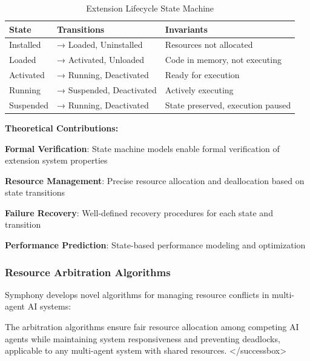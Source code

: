 \begin{successbox}
\begin{alertbox}
\begin{successbox}
\begin{alertbox}
\begin{infobox}[title=Theoretical Framework: AI-First Design Principles]
\begin{table}[ht]
\centering
\begin{tabular}{@{}lll@{}}
\toprule
\textbf{State} & \textbf{Transitions} & \textbf{Invariants} \\
\midrule
Installed & → Loaded, Uninstalled & Resources not allocated \\
Loaded & → Activated, Unloaded & Code in memory, not executing \\
Activated & → Running, Deactivated & Ready for execution \\
Running & → Suspended, Deactivated & Actively executing \\
Suspended & → Running, Deactivated & State preserved, execution paused \\
\bottomrule
\end{tabular}
\caption{Extension Lifecycle State Machine}
\label{tab:extension-states}
\end{table}

\textbf{Theoretical Contributions:}

\begin{expandedlist}
    \item \textbf{Formal Verification}: State machine models enable formal verification of extension system properties
    
    \item \textbf{Resource Management}: Precise resource allocation and deallocation based on state transitions
    
    \item \textbf{Failure Recovery}: Well-defined recovery procedures for each state and transition
    
    \item \textbf{Performance Prediction}: State-based performance modeling and optimization
\end{expandedlist}

\subsubsection{Resource Arbitration Algorithms}

Symphony develops novel algorithms for managing resource conflicts in multi-agent AI systems:

\begin{successbox}
The arbitration algorithms ensure fair resource allocation among competing AI agents while maintaining system responsiveness and preventing deadlocks, applicable to any multi-agent system with shared resources.
</successbox>


\end{successbox}
\end{infobox}
\end{alertbox}
\end{successbox}
\end{alertbox}
\end{successbox}
